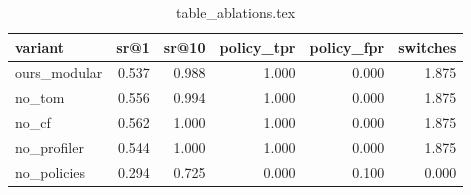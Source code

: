 \begin{table}
\centering
\begin{tabular}{lrrrrr}
\hline
variant & sr@1 & sr@10 & policy_tpr & policy_fpr & switches \\
\hline
ours_modular & 0.537 & 0.988 & 1.000 & 0.000 & 1.875 \\
no_tom & 0.556 & 0.994 & 1.000 & 0.000 & 1.875 \\
no_cf & 0.562 & 1.000 & 1.000 & 0.000 & 1.875 \\
no_profiler & 0.544 & 1.000 & 1.000 & 0.000 & 1.875 \\
no_policies & 0.294 & 0.725 & 0.000 & 0.100 & 0.000 \\
\hline
\end{tabular}
\caption{table_ablations.tex}
\end{table}

